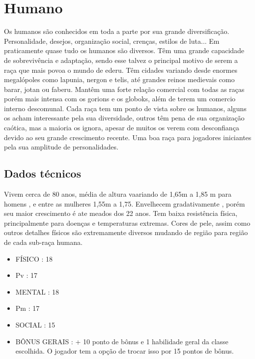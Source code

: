 \section{Humano}

Os humanos são conhecidos em toda a parte por sua grande diversificação. Personalidade, desejos, organização social, crenças, estilos de luta... Em praticamente quase tudo os humanos são diversos. Têm uma grande capacidade de sobrevivência e adaptação, sendo esse talvez o principal motivo de serem a raça que mais povoa o mundo de ederu. Têm cidades variando desde enormes megalópoles como lapunia, nergon e telis, até grandes reinos medievais como barar, jotan ou faberu. Mantêm uma forte relação comercial com todas as raças porém mais intensa com os gorions e os globoks, além de terem um comercio interno descomunal. Cada raça tem um ponto de vista sobre os humanos, alguns os acham interessante pela sua diversidade, outros têm pena de sua organização caótica, mas a maioria os ignora, apesar de muitos os verem com desconfiança devido ao seu grande crescimento recente. Uma boa raça para jogadores iniciantes pela sua amplitude de personalidades.

\subsection{Dados técnicos}

Vivem cerca de 80 anos, média de altura vaariando de 1,65m a 1,85 m para homens , e entre as mulheres 1,55m a 1,75. Envelhecem gradativamente , porém seu maior crescimento é ate meados dos 22 anos. Tem baixa resistência física, principalmente para doenças e temperaturas extremas. Cores de pele, assim como outros detalhes físicos são extremamente diversos mudando de região para região de cada sub-raça humana.


\begin{itemize}
	\item FÍSICO : 18
	\item Pv : 17 

	\item MENTAL : 18
	\item Pm : 17

	\item SOCIAL : 15

	\item BÔNUS GERAIS : + 10 ponto de bônus e 1 habilidade geral da classe escolhida. O jogador tem a opção de trocar isso por 15 pontos de bônus.
\end{itemize}


